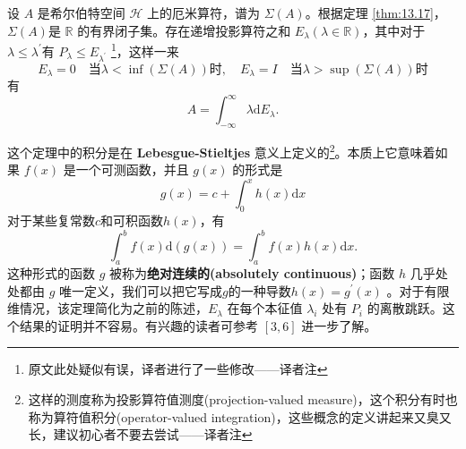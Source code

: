\begin{theorem}\label{thm:13.19}
    设 \(A\) 是希尔伯特空间 \(\mathcal{H}\) 上的厄米算符，谱为 \(\Sigma(A)\)。根据定理 \ref{thm:13.17}，\(\Sigma(A)\)是 \(\mathbb{R}\) 的有界闭子集。存在递增投影算符之和 \(E_{\lambda}(\lambda \in \mathbb{R})\)，其中对于 \(\lambda \leq \lambda^{\prime}\)有 \(P_{\lambda} \leq E_{\lambda^{\prime}}\) \footnote{原文此处疑似有误，译者进行了一些修改——译者注}，这样一来
\[
E_{\lambda}=0 \quad \text {当} \lambda<\inf (\Sigma(A))\text{时}, \quad E_{\lambda}=I \quad \text {当} \lambda>\sup (\Sigma(A))\text{时}
\]
有
\[
A=\int_{-\infty}^{\infty} \lambda \mathrm{d} E_{\lambda} .
\]
\end{theorem}

这个定理中的积分是在 \textbf{Lebesgue-Stieltjes} 意义上定义的\footnote{这样的测度称为投影算符值测度(projection-valued measure)，这个积分有时也称为算符值积分(operator-valued integration)，这些概念的定义讲起来又臭又长，建议初心者不要去尝试——译者注}。本质上它意味着如果 \(f(x)\) 是一个可测函数，并且 \(g(x)\) 的形式是
\[
g(x)=c+\int_{0}^{x} h(x) \mathrm{d} x
\]
对于某些复常数\(c\)和可积函数\(h(x)\)，有
\[
\int_{a}^{b} f(x) \mathrm{d}(g(x))=\int_{a}^{b} f(x) h(x) \mathrm{d} x .
\]
这种形式的函数 \(g\) 被称为\textbf{绝对连续的(absolutely continuous)}；函数 \(h\) 几乎处处都由 \(g\) 唯一定义，我们可以把它写成\(g\)的一种导数\(h(x)=g^{\prime}(x)\) 。对于有限维情况，该定理简化为之前的陈述，\(E_{\lambda}\) 在每个本征值 \(\lambda_{i}\) 处有 \(P_{i}\) 的离散跳跃。这个结果的证明并不容易。有兴趣的读者可参考 \([3,6]\) 进一步了解。
